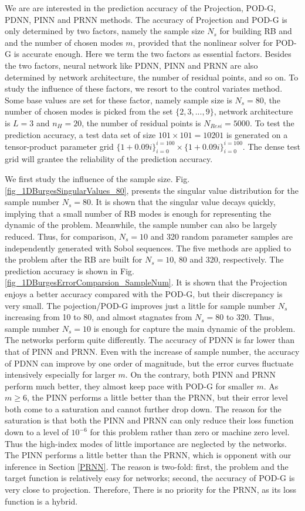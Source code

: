 \documentclass[preprint, 10pt]{elsarticle}
\begin{document}
We are are interested in the prediction accuracy of the Projection, POD-G, PDNN, PINN and PRNN methods. The accuracy of Projection and POD-G is only determined by two factors, namely the sample size $N_s$ for building RB and and the number of chosen modes $m$, provided that the nonlinear solver for POD-G is accurate enough. Here we term the two factors as essential factors.
Besides the two factors, neural network like PDNN, PINN and PRNN are also determined by network architecture, the number of residual points, and so on. To study the influence of these factors, we resort to the control variates method. Some base values are set for these factor, namely sample size is $N_s=80$, the number of chosen modes is picked from the set $\{2,3,...,9\}$,  network architecture is $L=3$ and $n_H=20$, the number of residual points is $N_{Resi}=5000$. To test the prediction accuracy, a test data set of size $101 \times 101=10201$ is generated on a tensor-product parameter grid $\{1+ 0.09i\}_{i=0}^{i=100} \times \{1+ 0.09i\}_{i=0}^{i=100}$. The dense test grid will grantee the reliability of the prediction accuracy.

We first study the influence of the sample size. Fig. \ref{fig_1DBurgesSingularValues_80}, presents the singular value distribution for the sample number $N_s=80$. It is shown that the singular value decays quickly, implying that  a small number of RB modes is enough for representing the dynamic of the problem. Meanwhile, the sample number can also be largely reduced. Thus, for comparison, $N_{s}=10$ and 320 random parameter samples are independently generated with Sobol sequences. The five methods are applied to the problem after the RB are built for $N_{s}=10$, 80 and 320, respectively. The prediction accuracy is shown in Fig. \ref{fig_1DBurgesErrorComparsion_SampleNum}. It is shown that the Projection enjoys a better accuracy compared with the POD-G, but their discrepancy is very small. The pojection/POD-G improves just a little for sample number $N_s$ increasing from 10 to 80, and almost stagnates from $N_s=80$ to 320. Thus, sample number $N_s=10$ is enough for capture the main dynamic of the problem. The networks perform quite differently. The accuracy of PDNN is far lower than that of PINN and PRNN. Even with the increase of sample number, the accuracy of PDNN can improve by one order of magnitude, but the error curves fluctuate intensively especially for larger $m$. On the contrary, both PINN and PRNN perform much better, they almost keep pace with POD-G for smaller $m$. As $m \ge 6$, the PINN performs a little better than the PRNN, but their error level both come to a saturation and cannot further drop down. The reason for the saturation is that both the PINN and PRNN can only reduce their loss function down to a level of $10^{-6}$ for this problem rather than zero or machine zero level. Thus the high-index modes of little importance are neglected by the networks.  The PINN performs a little better than the PRNN, which is opponent with our inference in Section \ref{PRNN}. The reason is two-fold: first, the problem and the target function is relatively easy for networks; second, the accuracy of POD-G is very close to projection. Therefore, There is no priority for the PRNN, as its loss function is a hybrid.
\end{document}
